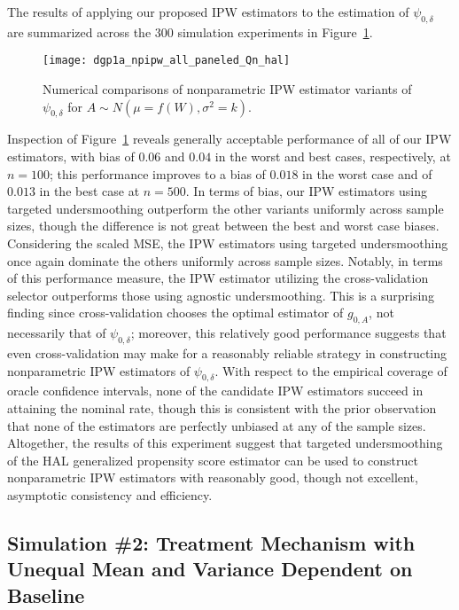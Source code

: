 The results of applying our proposed IPW estimators to the estimation of
$\psi_{0,\delta}$ are summarized across the $300$ simulation experiments in
Figure~\ref{fig:dgp1a_npipw}.
\begin{figure}[H]
  \centering
  \texttt{[image: dgp1a\_npipw\_all\_paneled\_Qn\_hal]}
  \caption{Numerical comparisons of nonparametric IPW estimator variants of
     $\psi_{0,\delta}$ for $A \sim N(\mu = f(W), \sigma^2 = k)$.}
  \label{fig:dgp1a_npipw}
\end{figure}
Inspection of Figure~\ref{fig:dgp1a_npipw} reveals generally acceptable
performance of all of our IPW estimators, with bias of $0.06$ and $0.04$ in the
worst and best cases, respectively, at $n=100$; this performance improves to a
bias of $0.018$ in the worst case and of $0.013$ in the best case at $n=500$. In
terms of bias, our IPW estimators using targeted undersmoothing outperform the
other variants uniformly across sample sizes, though the difference is not great
between the best and worst case biases. Considering the scaled MSE, the IPW
estimators using targeted undersmoothing once again dominate the others
uniformly across sample sizes. Notably, in terms of this performance measure,
the IPW estimator utilizing the cross-validation selector outperforms those
using agnostic undersmoothing. This is a surprising finding since
cross-validation chooses the optimal estimator of $g_{0,A}$, not necessarily
that of $\psi_{0,\delta}$; moreover, this relatively good performance suggests
that even cross-validation may make for a reasonably reliable strategy in
constructing nonparametric IPW estimators of $\psi_{0,\delta}$. With respect to
the empirical coverage of oracle confidence intervals, none of the candidate
IPW estimators succeed in attaining the nominal rate, though this is consistent
with the prior observation that none of the estimators are perfectly unbiased at
any of the sample sizes. Altogether, the results of this experiment suggest that
targeted undersmoothing of the HAL generalized propensity score estimator can be
used to construct nonparametric IPW estimators with reasonably good, though not
excellent, asymptotic consistency and efficiency.

\subsection{Simulation \#2: Treatment Mechanism with Unequal Mean and Variance
Dependent on Baseline}\label{hese_sim_norm}

